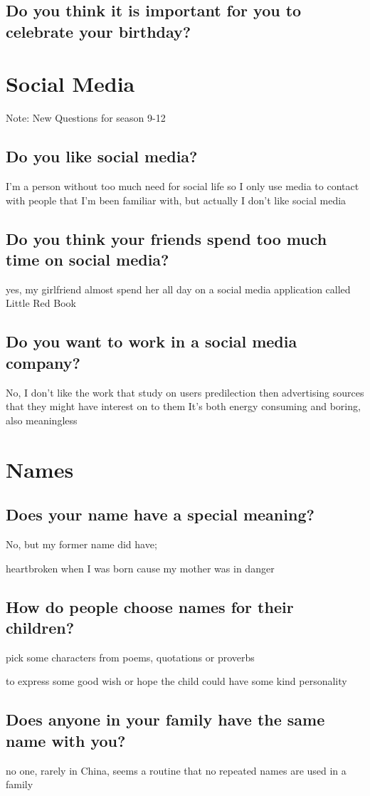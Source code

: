 \documentclass[conference]{IEEEtran}
\begin{document}
\subsection{Do you think it is important for you to celebrate your birthday?}

\section{Social Media}
Note: New Questions for season 9-12
\subsection{Do you like social media?}
I'm a person without too much need for social life
so I only use media to contact with people that I'm been
familiar with, but actually I don't like social media
\subsection{Do you think your friends spend too much time on social media?}
yes, my girlfriend almost spend her all day on a social media application
called Little Red Book
\subsection{Do you want to work in a social media company?}
No, I don't like the work that study on users predilection then
advertising sources that they might have interest on to them
It's both energy consuming and boring, also meaningless

\section{Names}
\subsection{Does your name have a special meaning?}
No, but my former name did have;

heartbroken when I was born cause my mother was in danger
\subsection{How do people choose names for their children?}
pick some characters from poems, quotations or proverbs

to express some good wish or hope the child could have some kind personality
\subsection{Does anyone in your family have the same name with you?}
no one, rarely in China, seems a routine that no repeated names are used in a family
\end{document}
